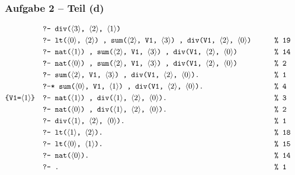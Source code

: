 \documentclass{beamer}
\newcommand{\num}[1]{\ensuremath{\langle #1 \rangle}}
\begin{document}
\begin{frame} \frametitle{Aufgabe 2 -- Teil (d)}
	\scriptsize
	\begin{alignat*}{2}
		&\texttt{?- div(\num{3}, \num{2}, \num{1})} \\
		&\texttt{?- lt(\num{0}, \num{2}) , sum(\num{2}, V1, \num{3}) , div(V1, \num{2}, \num{0})} \qquad && \texttt{\% 19 } \\
		&\texttt{?- nat(\num{1}) , sum(\num{2}, V1, \num{3}) , div(V1, \num{2}, \num{0})}  && \texttt{\% 14} \\
		&\texttt{?- nat(\num{0}) , sum(\num{2}, V1, \num{3}) , div(V1, \num{2}, \num{0})} && \texttt{\% 2} \\
		&\texttt{?- sum(\num{2}, V1, \num{3}) , div(V1, \num{2}, \num{0}).} && \texttt{\% 1} \\
		&\texttt{?-* sum(\num{0}, V1, \num{1}) , div(V1, \num{2}, \num{0}).} && \texttt{\% 4} \\
		\texttt{\{V1=\num{1}\}} \quad &\texttt{?- nat(\num{1}) , div(\num{1}, \num{2}, \num{0}).} && \texttt{\% 3} \\
		&\texttt{?- nat(\num{0}) , div(\num{1}, \num{2}, \num{0}).} \quad && \texttt{\% 2} \\
		&\texttt{?- div(\num{1}, \num{2}, \num{0}).} && \texttt{\% 1} \\
		&\texttt{?- lt(\num{1}, \num{2}).} &&\texttt{\% 18} \\
		&\texttt{?- lt(\num{0}, \num{1}).} &&\texttt{\% 15} \\
		&\texttt{?- nat(\num{0}).} &&\texttt{\% 14} \\
		&\texttt{?- .} &&\texttt{\% 1} \\
	\end{alignat*}
\end{frame}
\end{document}
